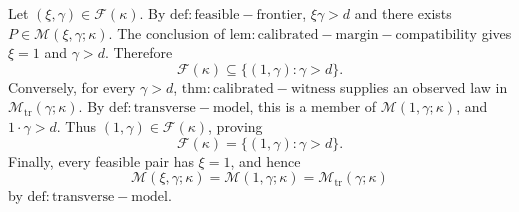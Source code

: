 Let \((\xi,\gamma)\in\mathcal F(\kappa)\). By \(\mathrm{def:feasible-frontier}\), \(\xi\gamma>d\) and there exists \(P\in\mathcal M(\xi,\gamma;\kappa)\). The conclusion of \(\mathrm{lem:calibrated-margin-compatibility}\) gives \(\xi=1\) and \(\gamma>d\). Therefore
\[
\mathcal F(\kappa)\subseteq\{(1,\gamma):\gamma>d\}.
\]
Conversely, for every \(\gamma>d\), \(\mathrm{thm:calibrated-witness}\) supplies an observed law in \(\mathcal M_{\mathrm{tr}}(\gamma;\kappa)\). By \(\mathrm{def:transverse-model}\), this is a member of \(\mathcal M(1,\gamma;\kappa)\), and \(1\cdot\gamma>d\). Thus \((1,\gamma)\in\mathcal F(\kappa)\), proving
\[
\mathcal F(\kappa)=\{(1,\gamma):\gamma>d\}.
\]
Finally, every feasible pair has \(\xi=1\), and hence
\[
\mathcal M(\xi,\gamma;\kappa)
=\mathcal M(1,\gamma;\kappa)
=\mathcal M_{\mathrm{tr}}(\gamma;\kappa)
\]
by \(\mathrm{def:transverse-model}\).